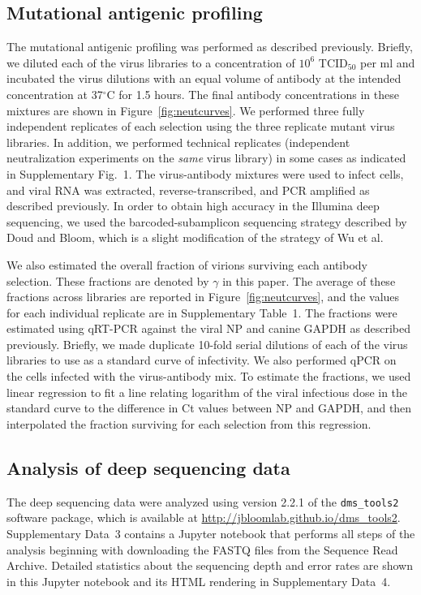 \documentclass[11pt]{article}
\begin{document}
\subsection*{Mutational antigenic profiling}
The mutational antigenic profiling was performed as described previously\cite{doud2017complete}. 
Briefly, we diluted each of the virus libraries to a concentration of $10^{6}$ TCID$_{50}$ per ml and incubated the virus dilutions with an equal volume of antibody at the intended concentration at 37$^\circ$C for 1.5 hours.
The final antibody concentrations in these mixtures are shown in Figure~\ref{fig:neutcurves}.
We performed three fully independent replicates of each selection using the three replicate mutant virus libraries.
In addition, we performed technical replicates (independent neutralization experiments on the \emph{same} virus library) in some cases as indicated in Supplementary Fig.~1.
The virus-antibody mixtures were used to infect cells, and viral RNA was extracted, reverse-transcribed, and PCR amplified as described previously\cite{doud2017complete}.
In order to obtain high accuracy in the Illumina deep sequencing, we used the barcoded-subamplicon sequencing strategy described by Doud and Bloom\cite{doud2016accurate}, which is a slight modification of the strategy of Wu et al\cite{wu2014high}.

We also estimated the overall fraction of virions surviving each antibody selection.
These fractions are denoted by $\gamma$ in this paper.
The average of these fractions across libraries are reported in Figure~\ref{fig:neutcurves}, and the values for each individual replicate are in Supplementary Table~1.
The fractions were estimated using qRT-PCR against the viral NP and canine GAPDH as described previously\cite{doud2017complete}.
Briefly, we made duplicate 10-fold serial dilutions of each of the virus libraries to use as a standard curve of infectivity.
We also performed qPCR on the cells infected with the virus-antibody mix.
To estimate the fractions, we used linear regression to fit a line relating logarithm of the viral infectious dose in the standard curve to the difference in Ct values between NP and GAPDH, and then interpolated the fraction surviving for each selection from this regression.

\subsection*{Analysis of deep sequencing data}
The deep sequencing data were analyzed using version 2.2.1 of the \texttt{dms\_tools2} software package\cite{bloom2015software}, which is available at \url{http://jbloomlab.github.io/dms_tools2}.
Supplementary Data~3 contains a Jupyter notebook that performs all steps of the analysis beginning with downloading the FASTQ files from the Sequence Read Archive.
Detailed statistics about the sequencing depth and error rates are shown in this Jupyter notebook and its HTML rendering in Supplementary Data~4.
\end{document}
